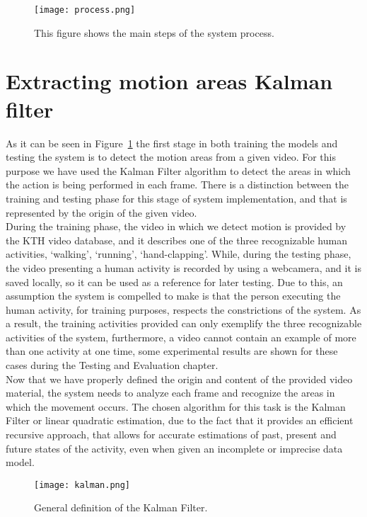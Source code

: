 \documentclass[11pt]{report}
\begin{document}
\begin{figure}
    \centering
    \texttt{[image: process.png]}
    \caption{This figure shows the main steps of the system process.}
    \label{fig:process}
\end{figure}

\section{Extracting motion areas Kalman filter}
As it can be seen in Figure~\ref{fig:process} the first stage in both training the models and testing the system is to detect the motion areas from a given video. For this purpose we have used the Kalman Filter algorithm to detect the areas in which the action is being performed in each frame. There is a distinction between the training and testing phase for this stage of system implementation, and that is represented by the origin of the given video. \\
During the training phase, the video in which we detect motion is provided by the KTH video database, and it describes one of the three recognizable human activities, `walking', `running', `hand-clapping'. While, during the testing phase, the video presenting a human activity is recorded by using a webcamera, and it is saved locally, so it can be used as a reference for later testing. Due to this, an assumption the system is compelled to make is that the person executing the human activity, for training purposes, respects the constrictions of the system. As a result, the training activities provided can only exemplify the three recognizable activities of the system, furthermore, a video cannot contain an example of more than one activity at one time, some experimental results are shown for these cases during the Testing and Evaluation chapter.  \\

Now that we have properly defined the origin and content of the provided video material, the system needs to analyze each frame and recognize the areas in which the movement occurs. The chosen algorithm for this task is the Kalman Filter or linear quadratic estimation, due to the fact that it provides an efficient recursive approach, that allows for accurate estimations of past, present and future states of the activity, even when given an incomplete or imprecise data model. \cite{Kalman-1} \\

\begin{figure}
    \centering
    \texttt{[image: kalman.png]}
    \caption{General definition of the Kalman Filter.}
    \label{fig:kalman}
\end{figure}
\end{document}
